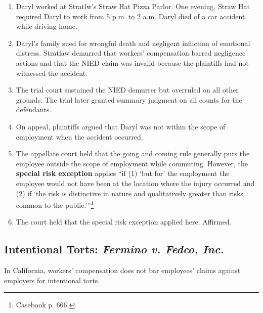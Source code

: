 \begin{enumerate}
    \item Daryl worked at Stratlw's Straw Hat Pizza Parlor. One evening, Straw 
    Hat required Daryl to work from 5 p.m. to 2 a.m. Daryl died of a car 
    accident while driving home.
    \item Daryl's family sued for wrongful death and negligent infliction of 
    emotional distress. Stratlaw demurred that workers' compensation barred 
    negligence actions and that the NIED claim was invalid because the 
    plaintiffs had not witnessed the accident.
    \item The trial court sustained the NIED demurrer but overruled on all 
    other grounds. The trial later granted summary judgment on all counts for 
    the defendants.
    \item On appeal, plaintiffs argued that Daryl was not within the scope of 
    employment when the accident occurred.
    \item The appellate court held that the going and coming rule generally 
    puts the employee outside the scope of employment while commuting. 
    However, the \textbf{special risk exception} applies ``if (1) `but for' 
    the employment the employee would not have been at the location where the 
    injury occurred and (2) if `the risk is distinctive in nature and 
    qualitatively greater than risks common to the 
    public.'''\footnote{Casebook p. 666.}
    \item The court held that the special risk exception applied here. 
    Affirmed.
\end{enumerate}

\subsection{Intentional Torts: \emph{Fermino v. Fedco, Inc.}}

In California, workers' compensation does not bar employees' claims against 
employers for intentional torts.

